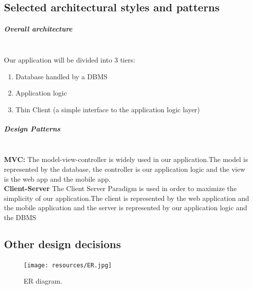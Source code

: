 \subsection{Selected architectural styles and patterns}
\subparagraph{Overall architecture}\emph{\\}
Our application will be divided into 3 tiers:
\begin{enumerate}
\item  Database handled by a DBMS
\item  Application logic 
\item Thin Client (a simple interface to the application logic layer)
\end{enumerate}
\subparagraph{Design Patterns}\emph{\\}
\textbf{MVC:} The model-view-controller is widely used in our application.The model is represented by the database, the controller is our application logic and the view is the  web app and the mobile app.\\
\textbf{Client-Server} The Client Server Paradigm is used in order to maximize the simplicity of our application.The client is represented by the web application and the mobile application and the server is represented by our application logic and the DBMS

\newpage
\subsection{Other design decisions}
\begin{figure}[hp]
\centering
\texttt{[image: resources/ER.jpg]}
\caption{\label{fig:er}ER diagram.}
\end{figure}

